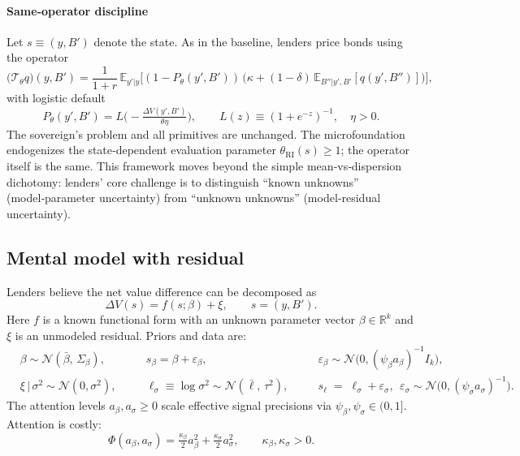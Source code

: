 \documentclass[12pt]{article}
\theoremstyle{plain}
\newcommand{\E}{\mathbb{E}}
\begin{document}
\paragraph{Same‑operator discipline}
Let $s\equiv(y,B')$ denote the state. As in the baseline, lenders price bonds
using the operator
\begin{equation*}
	\big(\mathcal T_\theta q\big)(y,B')=\frac{1}{1+r}\,\E_{y'|y}\Big[(1-P_\theta(y',B'))\,\big(\kappa+(1-\delta)\,\E_{B''|y',B'}[q(y',B'')]\big)\Big],
\end{equation*}
with logistic default
\begin{equation*}
	P_\theta(y',B')=L\!\Big(-\tfrac{\Delta V(y',B')}{\theta\eta}\Big),\qquad L(z)\equiv(1+e^{-z})^{-1},\quad \eta>0.
\end{equation*}
The sovereign’s problem and all primitives are unchanged. The microfoundation endogenizes the state‑dependent evaluation parameter $\theta_{\mathrm{RI}}(s)\ge 1$; the operator itself is the same. This framework moves beyond the simple mean‑vs‑dispersion dichotomy: lenders’ core challenge is to distinguish ``known unknowns'' (model‑parameter uncertainty) from ``unknown unknowns'' (model‑residual uncertainty).

\subsection{Mental model with residual}
Lenders believe the net value difference can be decomposed as
\begin{equation}\label{eq:mental_model}
	\Delta V(s)=f(s;\beta)+\xi,\qquad s=(y,B').
\end{equation}
Here $f$ is a known functional form with an unknown parameter vector $\beta\in\mathbb R^k$ and $\xi$ is an unmodeled residual. Priors and data are:
\begin{align}
	 & \beta\sim\mathcal N(\bar\beta,\,\Sigma_\beta),\quad &  & s_\beta=\beta+\varepsilon_\beta,\quad                                 &  & \varepsilon_\beta\sim\mathcal N\big(0,(\psi_\beta a_\beta)^{-1}I_k\big),\label{eq:beta_signal}                           \\
	 & \xi\,|\,\sigma^2\sim\mathcal N(0,\sigma^2),\quad    &  & \ell_\sigma\equiv\log\sigma^2\sim \mathcal N(\bar\ell,\,\tau^2),\quad &  & s_{\ell}\;=\;\ell_\sigma+\varepsilon_\sigma,\ \ \varepsilon_\sigma\sim\mathcal N\big(0,(\psi_\sigma a_\sigma)^{-1}\big).
\end{align}
The attention levels $a_\beta,a_\sigma\ge 0$ scale effective signal precisions via $\psi_\beta,\psi_\sigma\in(0,1]$. Attention is costly:
\begin{equation}\label{eq:attention_cost}
	\Phi(a_\beta,a_\sigma)=\tfrac{\kappa_\beta}{2}a_\beta^2+\tfrac{\kappa_\sigma}{2}a_\sigma^2,\qquad\kappa_\beta,\kappa_\sigma>0.
\end{equation}
\end{document}
